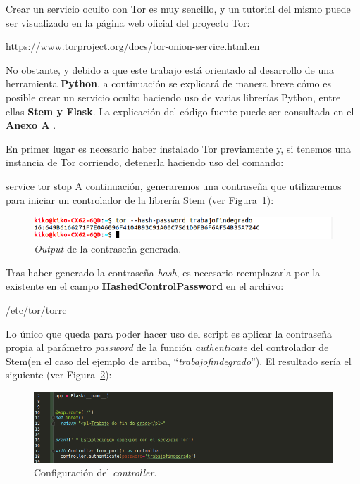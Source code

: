 Crear un servicio oculto con Tor es muy sencillo, y un tutorial del mismo puede ser visualizado en la página web oficial del proyecto Tor:

	{\selectfont 
		https://www.torproject.org/docs/tor-onion-service.html.en
	}

No obstante, y debido a que este trabajo está orientado al desarrollo de una herramienta \textbf{Python}, a continuación se explicará de manera breve cómo es posible crear un servicio oculto haciendo uso de varias librerías Python, entre ellas \textbf{Stem y Flask}.
La explicación del código fuente puede ser consultada en el \textbf{Anexo A }.

En primer lugar es necesario haber instalado Tor previamente y, si tenemos una instancia de Tor corriendo, detenerla haciendo uso del comando:

	{\selectfont 
		service tor stop
	}
A continuación, generaremos una contraseña que utilizaremos para iniciar un controlador de la librería Stem (ver Figura~\ref{fig:TorPwd}):

	\begin{figure}[H]
		\centerline{
			\mbox{\includegraphics[width=5.00in]{images/hashed_pwd.png}}
		}
		\caption{\textit{Output} de la contraseña generada.}
		\label{fig:TorPwd}
	\end{figure}
	
Tras haber generado la contraseña \textit{hash}, es necesario reemplazarla por la existente en el campo \textbf{HashedControlPassword} en el archivo:

	{\selectfont 
		/etc/tor/torrc
	}

Lo único que queda para poder hacer uso del script es aplicar la contraseña propia al parámetro \textit{password} de la función \textit{authenticate} del controlador de Stem(en el caso del ejemplo de arriba, ``\textit{trabajofindegrado}''). El resultado sería el siguiente (ver Figura~\ref{fig:controller}):

	\begin{figure}[H]
		\centerline{
			\mbox{\includegraphics[width=5.00in]{images/controller_auth.png}}
		}
		\caption{Configuración del \textit{controller}.}
		\label{fig:controller}
	\end{figure}

